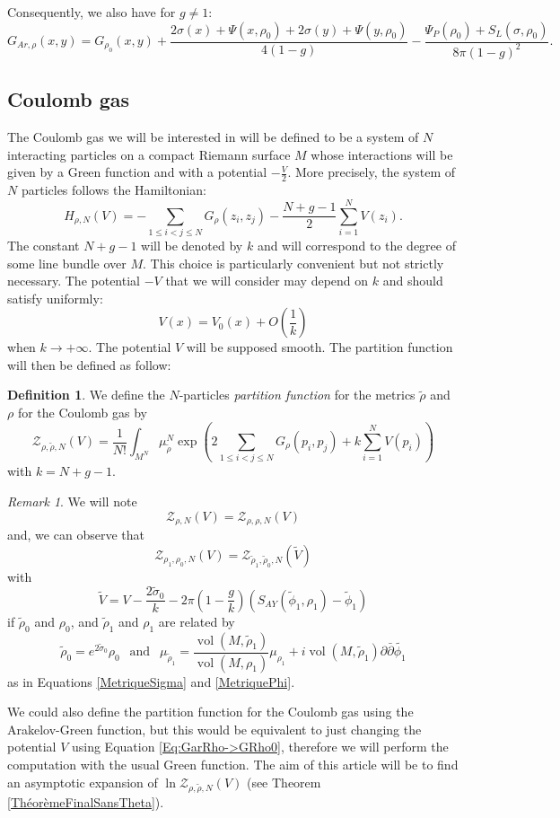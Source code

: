 \documentclass{article}
\theoremstyle{definition}
\newtheorem{Definition}[theorem]{Definition}
\theoremstyle{remark}
\newtheorem{Remark}[theorem]{Remark}
\DeclareMathOperator{\vol}{vol}
\begin{document}
Consequently, we also have for $g \neq 1$: 
\begin{equation}\label{Eq:GarRho->GRho0}
    G_{Ar,\rho}(x,y)=G_{\rho_{0}}(x,y)+\frac{2\sigma(x)+\Psi(x,\rho_{0})+2\sigma(y)+\Psi(y,\rho_{0})}{4(1-g)}-\frac{\Psi_{P}(\rho_{0})+S_{L}(\sigma,\rho_{0})}{8\pi(1-g)^{2}}.
\end{equation}

\subsection{Coulomb gas}
The Coulomb gas we will be interested in will be defined to be a system of $N$ interacting particles on a compact Riemann surface $M$ whose interactions will be given by a Green function and with a potential $-\frac{V}{2}.$ More precisely, the system of $N$ particles follows the Hamiltonian:  
$$H_{\rho,N}(V)=-\sum_{1\leq i <j \leq N} G_{\rho}(z_{i},z_{j})-\frac{N+g-1}{2}\sum_{i=1}^{N} V(z_{i}).$$ The constant $N+g-1$ will be denoted by $k$ and will correspond to the degree of some line bundle over $M$. This choice is particularly convenient but not strictly necessary. The potential $-V$ that we will consider may depend on $k$ and should satisfy uniformly: $$V(x)=V_{0}(x)+O\left(\frac{1}{k}\right)$$ when $k\to +\infty$. The potential $V$ will be supposed smooth.
The partition function will then be defined as follow: 

\begin{Definition}\label{DefFoncPart}
    We define the $N$-particles \emph{partition function} for the metrics $\tilde{\rho}$ and $\rho$ for the Coulomb gas by $$\mathcal{Z}_{\rho,\tilde{\rho},N}(V)=\frac{1}{N!}\int_{M^{N}}\mu_{\tilde{\rho}}^{N}\exp\left(2\sum_{1\leq i < j \leq N} G_{\rho}(p_{i},p_{j}) +k\sum_{i=1}^{N} V(p_{i})\right) $$
with $k=N+g-1.$
\end{Definition}

\begin{Remark} 
    We will note $$\mathcal{Z}_{\rho,N}(V)=\mathcal{Z}_{\rho,\rho,N}(V)$$ and, we can observe that $$\mathcal{Z}_{\rho_{1},\rho_{0},N}(V)=\mathcal{Z}_{\tilde{\rho}_{1},\tilde{\rho}_{0},N}(\tilde{V})$$ with $$\tilde{V}=V-\frac{2\tilde{\sigma}_{0}}{k}-2\pi \left(1-\frac{g}{k} \right)\left(S_{AY}(\tilde{\phi}_{1},\rho_{1})-\tilde{\phi}_{1} \right)$$ if $\tilde{\rho}_{0}$ and $\rho_{0}$, and $\tilde{\rho}_{1}$ and $\rho_{1}$ are related by  $$\tilde{\rho}_{0}=e^{2\tilde{\sigma}_{0}}\rho_{0}~~ \text{ and } ~~ \mu_{\tilde{\rho}_{1}}=\frac{\vol(M,\tilde{\rho}_{1})}{\vol(M,\rho_{1})}\mu_{\rho_{1}}+i\vol(M,\tilde{\rho}_{1})\partial\bar{\partial}\tilde{\phi_{1}}$$ as in Equations \eqref{MetriqueSigma} and \eqref{MetriquePhi}.
\end{Remark}
We could also define the partition function for the Coulomb gas using the Arakelov-Green function, but this would be equivalent to just changing the potential $V$ using Equation \eqref{Eq:GarRho->GRho0}, therefore we will perform the computation with the usual Green function.
The aim of this article will be to find an asymptotic expansion of $\ln\mathcal{Z}_{\rho,\tilde{\rho},N}(V)$ (see Theorem \ref{ThéorèmeFinalSansTheta}).
\end{document}
